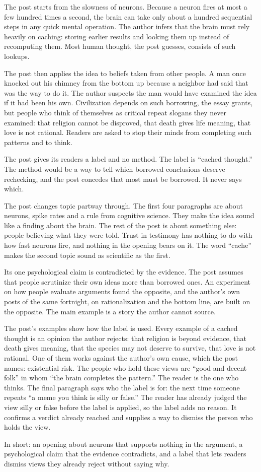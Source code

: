 \begin{afterword}
\summaryhead

The post starts from the slowness of neurons. Because a neuron fires at most a few hundred times a second, the brain can take only about a hundred sequential steps in any quick mental operation. The author infers that the brain must rely heavily on caching: storing earlier results and looking them up instead of recomputing them. Most human thought, the post guesses, consists of such lookups.

The post then applies the idea to beliefs taken from other people. A man once knocked out his chimney from the bottom up because a neighbor had said that was the way to do it. The author suspects the man would have examined the idea if it had been his own. Civilization depends on such borrowing, the essay grants, but people who think of themselves as critical repeat slogans they never examined: that religion cannot be disproved, that death gives life meaning, that love is not rational. Readers are asked to stop their minds from completing such patterns and to think.

\responsehead

The post gives its readers a label and no method. The label is ``cached thought.'' The method would be a way to tell which borrowed conclusions deserve rechecking, and the post concedes that most must be borrowed. It never says which.

The post changes topic partway through. The first four paragraphs are about neurons, spike rates and a rule from cognitive science. They make the idea sound like a finding about the brain. The rest of the post is about something else: people believing what they were told. Trust in testimony has nothing to do with how fast neurons fire, and nothing in the opening bears on it. The word ``cache'' makes the second topic sound as scientific as the first.

Its one psychological claim is contradicted by the evidence. The post assumes that people scrutinize their own ideas more than borrowed ones. An experiment on how people evaluate arguments found the opposite, and the author's own posts of the same fortnight, on rationalization and the bottom line, are built on the opposite. The main example is a story the author cannot source.

The post's examples show how the label is used. Every example of a cached thought is an opinion the author rejects: that religion is beyond evidence, that death gives meaning, that the species may not deserve to survive, that love is not rational. One of them works against the author's own cause, which the post names: existential risk. The people who hold these views are ``good and decent folk'' in whom ``the brain completes the pattern.'' The reader is the one who thinks. The final paragraph says who the label is for: the next time someone repeats ``a meme you think is silly or false.'' The reader has already judged the view silly or false before the label is applied, so the label adds no reason. It confirms a verdict already reached and supplies a way to dismiss the person who holds the view.

In short: an opening about neurons that supports nothing in the argument, a psychological claim that the evidence contradicts, and a label that lets readers dismiss views they already reject without saying why.
\end{afterword}
